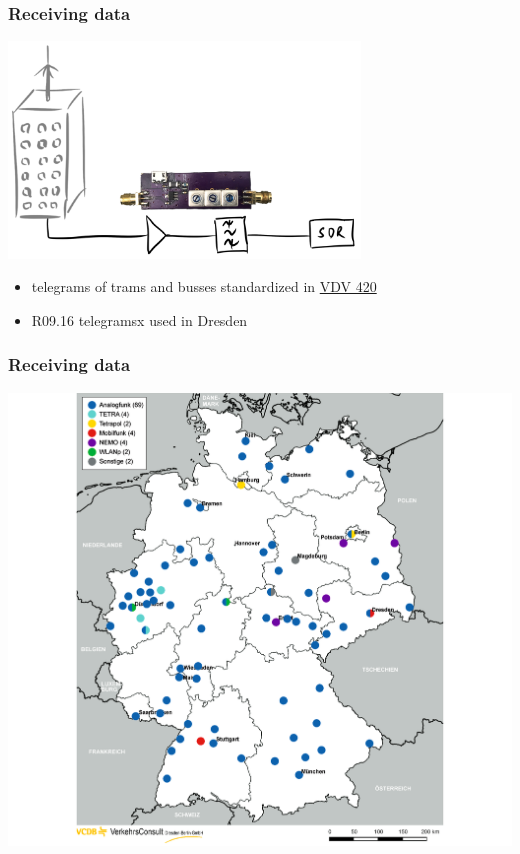 \documentclass[aspectratio=169]{beamer}
\begin{document}
\begin{frame}
\frametitle{Receiving data}
\centering
\includegraphics[width=0.7\textwidth]{figs/antenna-filter.pdf}
\end{frame}

\begin{frame}
	\begin{itemize}
	\item telegrams of trams and busses standardized in \href{https://knowhow.vdv.de/documents/420/}{VDV 420}
	\item R09.16 telegramsx used in Dresden
	\end{itemize}
\end{frame}

\begin{frame}
\frametitle{Receiving data}
\centering

\includegraphics[height=0.8\textheight]{figs/vcdb-map-ampelbeeinflussung.png}
\end{frame}
\end{document}
